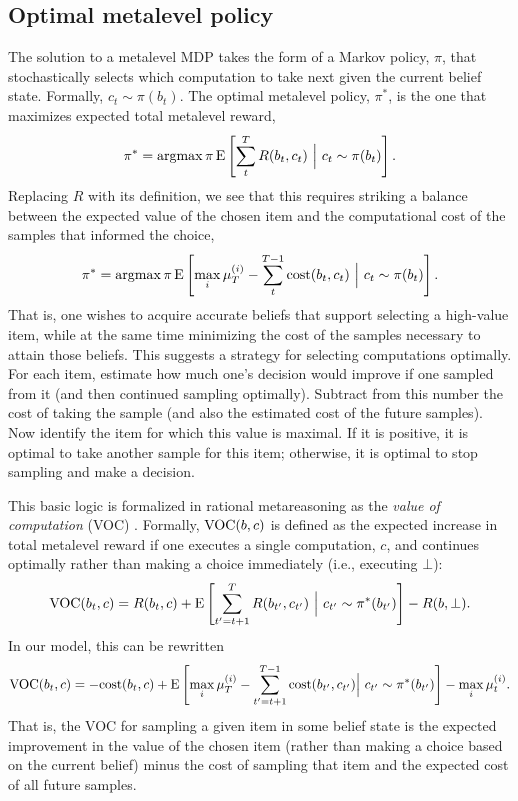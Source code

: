 \subsection{Optimal metalevel policy}

The solution to a metalevel MDP takes the form of a Markov policy, $\pi$, that stochastically selects which computation to take next given the current belief state. Formally, $c_t \sim \pi(b_t)$. The optimal metalevel policy, $\pi^*$, is the one that maximizes expected total metalevel reward,
\begin{equation*}
  \pi^* = \operatorname*{argmax}{\pi} \operatorname*{E} \left[ \sum_t^T R(b_t, c_t) \ \Big\vert\ c_t \sim \pi(b_t) \right].
\end{equation*}
Replacing $R$ with its definition, we see that this requires striking a balance between the expected value of the chosen item and the computational cost of the samples that informed the choice,
\begin{equation*}
  \pi^* = \operatorname*{argmax}{\pi} \operatorname*{E} \left[
     \max_i \mu_T^{(i)} - \sum_t^{T-1} \text{cost}(b_t, c_t)
   \ \Big\vert\ c_t \sim \pi(b_t) \right].
\end{equation*}
That is, one wishes to acquire accurate beliefs that support selecting a high-value item, while at the same time minimizing the cost of the samples necessary to attain those beliefs. This suggests a strategy for selecting computations optimally. For each item, estimate how much one's decision would improve if one sampled from it (and then continued sampling optimally). Subtract from this number the cost of taking the sample (and also the estimated cost of the future samples). Now identify the item for which this value is maximal. If it is positive, it is optimal to take another sample for this item; otherwise, it is optimal to stop sampling and make a decision.

This basic logic is formalized in rational metareasoning as the \textit{value of computation} (VOC) \citep{russell1991principles}. Formally, $\text{VOC}(b, c)$ is defined as the expected increase in total metalevel reward if one executes a single computation, $c$, and continues optimally rather than making a choice immediately (i.e., executing $\bot$):
$$
\text{VOC}(b_t, c) = R(b_t, c) + \operatorname*{E} \left[
  \sum_{t'=t+1}^T R(b_{t'}, c_{t'})\ \Big\vert\ c_{t'} \sim \pi^*(b_{t'}) 
\right] - R(b, \bot).
$$
In our model, this can be rewritten
$$
\text{VOC}(b_t, c) = -\text{cost}(b_t, c) + \operatorname*{E} \left[ 
  \max_i \mu_T^{(i)} - \sum_{t'=t+1}^{T-1} \text{cost}(b_{t'}, c_{t'})
  \Big\vert\ c_{t'} \sim \pi^*(b_{t'})
\right] -  \max_i \mu_t^{(i)}.
$$
That is, the VOC for sampling a given item in some belief state is the expected improvement in the value of the chosen item (rather than making a choice based on the current belief) minus the cost of sampling that item and the expected cost of all future samples.

